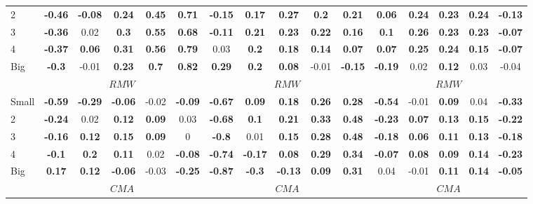\begin{table}[H]
\begin{tabular}{lccccc|ccccc|ccccc}
2 & \textbf{-0.46} & \textbf{-0.08} & \textbf{0.24} & \textbf{0.45} & \textbf{0.71} & \textbf{-0.15} & \textbf{0.17} & \textbf{0.27} & \textbf{0.2} & \textbf{0.21} & \textbf{0.06} & \textbf{0.24} & \textbf{0.23} & \textbf{0.24} & \textbf{-0.13} \\
3 & \textbf{-0.36} & 0.02 & \textbf{0.3} & \textbf{0.55} & \textbf{0.68} & \textbf{-0.11} & \textbf{0.21} & \textbf{0.23} & \textbf{0.22} & \textbf{0.16} & \textbf{0.1} & \textbf{0.26} & \textbf{0.23} & \textbf{0.23} & \textbf{-0.07} \\
4 & \textbf{-0.37} & \textbf{0.06} & \textbf{0.31} & \textbf{0.56} & \textbf{0.79} & 0.03 & \textbf{0.2} & \textbf{0.18} & \textbf{0.14} & \textbf{0.07} & \textbf{0.07} & \textbf{0.25} & \textbf{0.24} & \textbf{0.15} & \textbf{-0.07} \\
Big & \textbf{-0.3} & -0.01 & \textbf{0.23} & \textbf{0.7} & \textbf{0.82} & \textbf{0.29} & \textbf{0.2} & \textbf{0.08} & -0.01 & \textbf{-0.15} & \textbf{-0.19} & 0.02 & \textbf{0.12} & 0.03 & -0.04 \\
 & \multicolumn{5}{c|}{$RMW$} & \multicolumn{5}{c|}{$RMW$} & \multicolumn{5}{c}{$RMW$} \\
Small & \textbf{-0.59} & \textbf{-0.29} & \textbf{-0.06} & -0.02 & \textbf{-0.09} & \textbf{-0.67} & \textbf{0.09} & \textbf{0.18} & \textbf{0.26} & \textbf{0.28} & \textbf{-0.54} & -0.01 & \textbf{0.09} & 0.04 & \textbf{-0.33} \\
2 & \textbf{-0.24} & 0.02 & \textbf{0.12} & \textbf{0.09} & 0.03 & \textbf{-0.68} & \textbf{0.1} & \textbf{0.21} & \textbf{0.33} & \textbf{0.48} & \textbf{-0.23} & \textbf{0.07} & \textbf{0.13} & \textbf{0.15} & \textbf{-0.22} \\
3 & \textbf{-0.16} & \textbf{0.12} & \textbf{0.15} & \textbf{0.09} & 0 & \textbf{-0.8} & 0.01 & \textbf{0.15} & \textbf{0.28} & \textbf{0.48} & \textbf{-0.18} & \textbf{0.06} & \textbf{0.11} & \textbf{0.13} & \textbf{-0.18} \\
4 & \textbf{-0.1} & \textbf{0.2} & \textbf{0.11} & 0.02 & \textbf{-0.08} & \textbf{-0.74} & \textbf{-0.17} & \textbf{0.08} & \textbf{0.29} & \textbf{0.34} & \textbf{-0.07} & \textbf{0.08} & \textbf{0.09} & \textbf{0.14} & \textbf{-0.23} \\
Big & \textbf{0.17} & \textbf{0.12} & \textbf{-0.06} & -0.03 & \textbf{-0.25} & \textbf{-0.87} & \textbf{-0.3} & \textbf{-0.13} & \textbf{0.09} & \textbf{0.31} & 0.04 & -0.01 & \textbf{0.11} & \textbf{0.14} & \textbf{-0.05} \\
 & \multicolumn{5}{c|}{$CMA$} & \multicolumn{5}{c|}{$CMA$} & \multicolumn{5}{c}{$CMA$} \\

\end{tabular}
\end{table}
